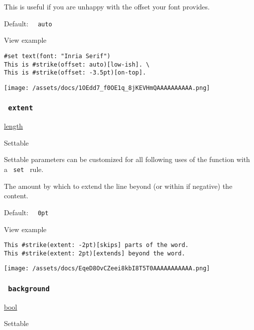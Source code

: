 This is useful if you are unhappy with the offset your font provides.

Default: \texttt{\ }{\texttt{\ auto\ }}\texttt{\ }


View example

\begin{verbatim}
#set text(font: "Inria Serif")
This is #strike(offset: auto)[low-ish]. \
This is #strike(offset: -3.5pt)[on-top].
\end{verbatim}

\texttt{[image: /assets/docs/1OEdd7\_f0OE1q\_8jKEVHmQAAAAAAAAAA.png]}

\subsubsection{\texorpdfstring{\texttt{\ extent\ }}{ extent }}\label{parameters-extent}

\href{/docs/reference/layout/length/}{length}

{{ Settable }}

\label{parameters-extent-settable-tooltip}
Settable parameters can be customized for all following uses of the
function with a \texttt{\ set\ } rule.

The amount by which to extend the line beyond (or within if negative)
the content.

Default: \texttt{\ }{\texttt{\ 0pt\ }}\texttt{\ }


View example

\begin{verbatim}
This #strike(extent: -2pt)[skips] parts of the word.
This #strike(extent: 2pt)[extends] beyond the word.
\end{verbatim}

\texttt{[image: /assets/docs/EqeD8OvCZeei8kbI8T5T0AAAAAAAAAAA.png]}

\subsubsection{\texorpdfstring{\texttt{\ background\ }}{ background }}\label{parameters-background}

\href{/docs/reference/foundations/bool/}{bool}

{{ Settable }}

